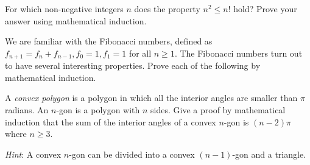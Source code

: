 \documentclass[a4paper]{exam}
\begin{document}
\begin{questions}
\question For which non-negative integers $n$ does the property $n^2 \le n!$ hold? Prove your answer using mathematical induction.
  \begin{solution}
  \end{solution}

\question We are familiar with the Fibonacci numbers, defined as $f_{n+1} = f_n + f_{n-1}, f_0=1, f_1=1$ for all $n \geq 1$. The Fibonacci numbers turn out to have several interesting properties. Prove each of the following by mathematical induction.

\question A \textit{convex polygon} is a polygon in which all the interior angles are smaller than $\pi$ radians. An $n$-gon is a polygon with $n$ sides. Give a proof by mathematical induction that the sum of the interior angles of a convex $n$-gon is $(n-2)\pi$ where $n\ge 3$. 

  \textit{Hint}: A convex $n$-gon can be divided into a convex $(n-1)$-gon and a triangle.
  \begin{solution}
  \end{solution}
  

\end{questions}
\end{document}
